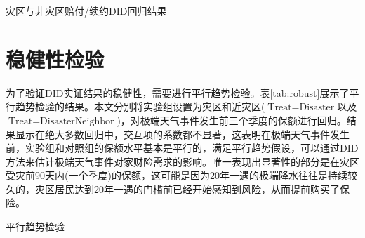 \begin{table}[H]
    \centering
    \caption{灾区与非灾区赔付/续约DID回归结果}\label{tab:claims}
    
\end{table}

\section{稳健性检验}
为了验证DID实证结果的稳健性，需要进行平行趋势检验。表\ref{tab:robust}展示了平行趋势检验的结果。本文分别将实验组设置为灾区和近灾区($\text{Treat}=\text{Disaster}$以及$\text{Treat}=\text{Disaster}\text{Neighbor}$)，对极端天气事件发生前三个季度的保额进行回归。结果显示在绝大多数回归中，交互项的系数都不显著，这表明在极端天气事件发生前，实验组和对照组的保额水平基本是平行的，满足平行趋势假设，可以通过DID方法来估计极端天气事件对家财险需求的影响。唯一表现出显著性的部分是在灾区受灾前90天内(一个季度)的保额，这可能是因为20年一遇的极端降水往往是持续较久的，灾区居民达到20年一遇的门槛前已经开始感知到风险，从而提前购买了保险。
\begin{table}[htbp]
    \centering
    \caption{平行趋势检验}\label{tab:robust}
    
\end{table}
